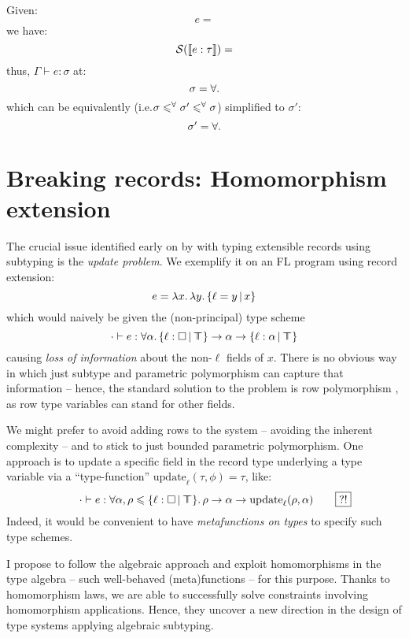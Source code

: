 \begin{example}
    Given:
    $$ e =  $$
    we have:
    $$ \mathcal S(\denot{e : \tau}) = $$
    thus, $\Gamma \vdash e : \sigma$ at:
    $$ \sigma = \forall \ldotp  $$
    which can be equivalently (i.e.\@ $\sigma \leqslant^\forall \sigma' \leqslant^\forall \sigma$) simplified to $\sigma'$:
    $$ \sigma' = \forall \ldotp $$
\end{example}

\section{Breaking records: Homomorphism extension}
\label{sec:morphisms}

The crucial issue identified early on by \textcite{operations-on-records} with typing extensible records using subtyping is the \emph{update problem}. We exemplify it on an FL program using record extension:
$$ e = \fllam x \fllam y \flext{\ell = y}{x} $$
which would naively be given the (non-principal) type scheme
$$ \cdot \vdash e : \forall \alpha \ldotp \flext{\ell : \flabsent}{\flftop} \to \alpha \to \flext{\ell : \alpha}{\flftop} $$
causing \emph{loss of information} about the non-$\ell$ fields of $x$. There is no obvious way in which just subtype and parametric polymorphism can capture that information -- hence, the standard solution to the problem is row polymorphism \cite{remy-records}, as row type variables can stand for other fields. 

We might prefer to avoid adding rows to the system -- avoiding the inherent complexity -- and to stick to just bounded parametric polymorphism. One approach is to update a specific field in the record type underlying a type variable \cite{operations-on-records} via a \enquote{type-function} $\mathrm{update}_\ell(\tau, \phi) = \tau$, like:
$$ \qquad \cdot \vdash e : \forall \alpha, \rho \sub \flext{\ell : \flabsent}{\flftop} \ldotp \rho \to \alpha \to \mathrm{update}_\ell(\rho, \alpha) \qquad \boxed{?!} $$
Indeed, it would be convenient to have \emph{metafunctions on types} to specify such type schemes.

I propose to follow the algebraic approach and exploit homomorphisms in the type algebra -- such well-behaved (meta)functions -- for this purpose. Thanks to homomorphism laws, we are able to successfully solve constraints involving homomorphism applications. Hence, they uncover a new direction in the design of type systems applying algebraic subtyping.

